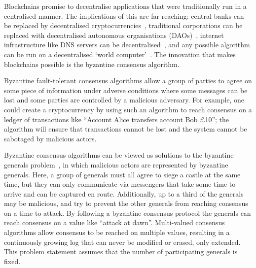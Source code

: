 
Blockchains promise to decentralise applications that were traditionally run in a centralised manner. The implications of this are far-reaching: central banks can be replaced by decentralised cryptocurrencies~\cite{nakamotoBitcoinPeertoPeerElectronic2008,perniceCryptocurrency2021}, traditional corporations can be replaced with decentralised autonomous organisations (DAOs)~\cite{hassanDecentralizedAutonomousOrganization2021,ethereumWhite}, internet infrastructure like DNS servers can be decentralised~\cite{EthereumNameService}, and any possible algorithm can be run on a decentralised `world computer'~\cite{ethereumWhite,ethereumYellow}. The innovation that makes blockchains possible is the byzantine consensus algorithm.

Byzantine fault-tolerant consensus algorithms allow a group of parties to agree on some piece of information under adverse conditions where some messages can be lost and some parties are controlled by a malicious adversary. For example, one could create a cryptocurrency by using such an algorithm to reach consensus on a ledger of transactions like ``Account Alice transfers account Bob £10''; the algorithm will ensure that transactions cannot be lost and the system cannot be sabotaged by malicious actors.

Byzantine consensus algorithms can be viewed as solutions to the byzantine generals problem~\cite{lamportByzantineGeneralsProblem1982}, in which malicious actors are represented by byzantine generals. Here, a group of generals must all agree to siege a castle at the same time, but they can only communicate via messengers that take some time to arrive and can be captured en route. Additionally, up to a third of the generals may be malicious, and try to prevent the other generals from reaching consensus on a time to attack. By following a byzantine consensus protocol the generals can reach consensus on a value like ``attack at dawn''. Multi-valued consensus algorithms allow consensus to be reached on multiple values, resulting in a continuously growing log that can never be modified or erased, only extended. This problem statement assumes that the number of participating generals is fixed.

